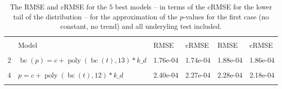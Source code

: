 \documentclass[12pt,a4paper]{article}
\DeclareMathOperator{\bc}{bc}
\DeclareMathOperator{\poly}{poly}
\begin{document}
\FloatBarrier
\begin{table}[!h]

\caption{\label{tab:5 best all_1}\label{tab:best_all_1} The RMSE and cRMSE for the $5$ best models -- in terms of the cRMSE for the lower tail of the distribution -- for the approximation of the $p$-values for the first case (no constant, no trend) and all underyling test included.}
\centering
\begin{tabular}[t]{ll>{\raggedleft\arraybackslash}p{2cm}>{\raggedleft\arraybackslash}p{2cm}>{\raggedleft\arraybackslash}p{2cm}>{\raggedleft\arraybackslash}p{2cm}}
\toprule
\multicolumn{1}{c}{\textbf{}} & \multicolumn{1}{c}{\textbf{}} & \multicolumn{2}{c}{\textbf{Full Distribution}} & \multicolumn{2}{c}{\textbf{Lower Tail ($p \leq 0.2$)}} \\
\cmidrule(l{3pt}r{3pt}){3-4} \cmidrule(l{3pt}r{3pt}){5-6}
  & Model & RMSE & cRMSE & RMSE & cRMSE\\
\midrule
\cellcolor{gray!6}{1} & \cellcolor{gray!6}{$p = c + \poly\left( \bc(t), 13 \right) * k\_d$} & \cellcolor{gray!6}{1.79e-04} & \cellcolor{gray!6}{1.73e-04} & \cellcolor{gray!6}{1.73e-04} & \cellcolor{gray!6}{1.71e-04}\\
2 & $\bc(p) = c + \poly\left( \bc(t), 13 \right) * k\_d$ & 1.76e-04 & 1.74e-04 & 1.88e-04 & 1.86e-04\\
\cellcolor{gray!6}{3} & \cellcolor{gray!6}{$\bc(p) = c + \poly\left( \bc(t), 12 \right) * k\_d$} & \cellcolor{gray!6}{2.00e-04} & \cellcolor{gray!6}{1.95e-04} & \cellcolor{gray!6}{2.10e-04} & \cellcolor{gray!6}{2.05e-04}\\
4 & $p = c + \poly\left( \bc(t), 12 \right) * k\_d$ & 2.40e-04 & 2.27e-04 & 2.28e-04 & 2.18e-04\\
\cellcolor{gray!6}{5} & \cellcolor{gray!6}{$\bc(p) = c + \poly\left( \bc(t), 11 \right) * k\_d$} & \cellcolor{gray!6}{2.16e-04} & \cellcolor{gray!6}{2.09e-04} & \cellcolor{gray!6}{2.28e-04} & \cellcolor{gray!6}{2.19e-04}\\
\bottomrule
\end{tabular}
\end{table}

\begingroup\fontsize{5}{7}\selectfont
\end{document}

